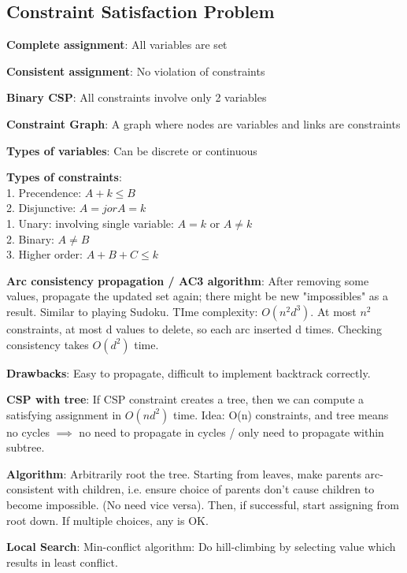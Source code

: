 \documentclass[a4paper,landscape]{article}
\newcommand{\rntopic}[1]{\vspace{-2.0em}\subsection*{#1}\vspace{-1.0em}}
\newcommand{\rnname}[1]{\textbf{#1}}
\begin{document}
\begin{multicols*}{4}
\begin{flatitemize}
\rntopic{Constraint Satisfaction Problem}
\item \rnname{Complete assignment}: All variables are set
\item \rnname{Consistent assignment}: No violation of constraints
\item \rnname{Binary CSP}: All constraints involve only 2 variables
\item \rnname{Constraint Graph}: A graph where nodes are variables and links are constraints
\item \rnname{Types of variables}: Can be discrete or continuous
\item \rnname{Types of constraints}:\\
1. Precendence: $A + k \leq B$ \\
2. Disjunctive: $A = j or A = k$\\

1. Unary: involving single variable: $A = k$ or $A \neq k$\\
2. Binary: $A \neq B$\\
3. Higher order: $A + B + C \leq k$
\item \rnname{Arc consistency propagation / AC3 algorithm}: After removing some values, propagate the updated set again; there might be new "impossibles" as a result. Similar to playing Sudoku. TIme complexity: $O(n^2d^3)$. At most $n^2$ constraints, at most d values to delete, so each arc inserted d times. Checking consistency takes $O(d^2)$ time.
\item \rnname{Drawbacks}: Easy to propagate, difficult to implement backtrack correctly.
\item \rnname{CSP with tree}: If CSP constraint creates a tree, then we can compute a satisfying assignment in $O(nd^2)$ time. Idea: O(n) constraints, and tree means no cycles $\implies$ no need to propagate in cycles / only need to propagate within subtree.
\item \rnname{Algorithm}: Arbitrarily root the tree. Starting from leaves, make parents arc-consistent with children, i.e. ensure choice of parents don't cause children to become impossible. (No need vice versa). Then, if successful, start assigning from root down. If multiple choices, any is OK.
\item \rnname{Local Search}: Min-conflict algorithm: Do hill-climbing by selecting value which results in least conflict.
\end{flatitemize}


\end{multicols*}
\end{document}
